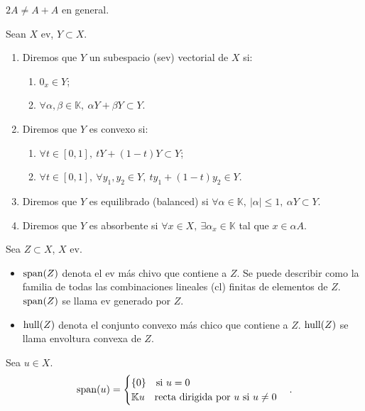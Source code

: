 \begin{note}
	$2A \neq A + A$ en general.
\end{note}

\begin{definition}
	Sean $X$ ev, $Y \subset X$. 
	\begin{enumerate}
		\item Diremos que $Y$ un subespacio (sev) vectorial de $X$ si:
		\begin{enumerate}
			\item $0_{x} \in Y$;

			\item $\forall \alpha, \beta \in \mathbb{K},\ \alpha Y + \beta Y \subset Y$.
		\end{enumerate}

		\item Diremos que $Y$ es convexo si:
		\begin{enumerate}
			\item $\forall t \in [0,1],\ tY + (1 - t) Y \subset Y$;

			\item $\forall t \in [0,1],\ \forall y_{1},y_{2} \in Y,\ ty_{1} + (1 - t) y_{2} \in Y$.
		\end{enumerate}

		\item Diremos que $Y$ es equilibrado (balanced) si $\forall \alpha \in \mathbb{K},\ | \alpha | \leq 1,\ \alpha Y \subset Y$.

		\item Diremos que $Y$ es absorbente si $\forall x \in X,\ \exists \alpha_{x} \in \mathbb{K}$ tal que $x \in \alpha A$.
	\end{enumerate}
\end{definition}

\begin{observe}
	Sea $Z \subset X$, $X$ ev.
	\begin{itemize}
		\item $\operatorname{span} (Z)$ denota el ev más chivo que contiene a $Z$. Se puede describir como la familia de todas las combinaciones lineales (cl) finitas de elementos de $Z$. $\operatorname{span} (Z)$ se llama ev generado por $Z$.

		\item $\operatorname{hull} (Z)$ denota el conjunto convexo más chico que contiene a $Z$. $\operatorname{hull}(Z)$ se llama envoltura convexa de $Z$.
	\end{itemize}
\end{observe}

\begin{eg}
	Sea $u \in X$.
	\begin{align*}
		\operatorname{span}(u) = \begin{cases}
			\{ 0 \} \quad \text{si } u = 0 \\
			\mathbb{K} u \quad \text{recta dirigida por } u \text{ si } u \neq 0
		\end{cases}
	.\end{align*}
\end{eg}

